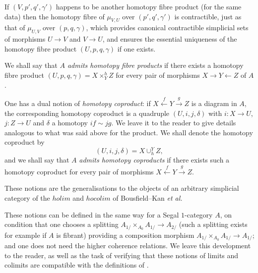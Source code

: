  If $(V, p',q',\gamma ')$ happens to be another homotopy fibre product
(for the same data)
then the homotopy fibre of $\mu _{V,U}$ over $(p',q',\gamma ')$ is
contractible, just as that of $\mu _{U,V}$
over $(p,q,\gamma)$, which
provides canonical contractible simplicial
sets of morphisms $U\rightarrow V$ and
$V\rightarrow U$, and ensures the essential uniqueness of the homotopy fibre
product $(U,p,q,\gamma )$ if one exists.

We shall say that {\em $A$ admits homotopy fibre products} if there
exists a
homotopy fibre product $(U,p,q,\gamma )= X\times ^h_YZ$ for every
pair of morphisms $X\rightarrow Y\leftarrow Z$ of $A$.

One has a dual notion of {\em homotopy coproduct}: if
$X\stackrel{f}{\leftarrow} Y\stackrel{g}{\rightarrow} Z$ is a
diagram in
$A$, the corresponding homotopy coproduct is a
quadruple $(U, i,j,\delta )$ with $i: X\rightarrow U$,
$j: Z\rightarrow U$ and $\delta$ a homotopy $if\sim jg$. We leave it to the
reader
to give details analogous to what was said above for the product.
We shall denote the homotopy coproduct by
$$
(U,i,j,\delta ) = X\cup _h^YZ,
$$
and we shall say that $A$ {\em admits homotopy coproducts} if there exists
such a homotopy
coproduct for every pair of morphisms
$X\stackrel{f}{\leftarrow} Y\stackrel{g}{\rightarrow} Z$.

These notions are the generalisations to the objects of an arbitrary
simplicial category of the $holim$ and $hocolim$ of Bousfield--Kan
\cite{BousfieldKan} {\em et al.}

These notions can be defined in the same way
for a Segal $1$-category $A$, on condition that one
chooses a splitting $A_{1/}\times
_{A_0}A_{1/}\rightarrow A_{2/}$ (such a splitting exists for example
if $A$ is fibrant)
providing a composition morphism
$A_{1/}\times
_{A_0}A_{1/}\rightarrow A_{1/}$; and one does not need the higher coherence
relations. We leave this development
to the reader, as well as the task of verifying that these
notions of limits and colimits are compatible with the definitions of
\cite{limits}.

